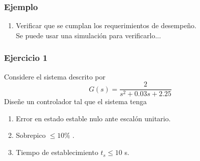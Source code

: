 \documentclass[aspectratio=169]{beamer}
\theoremstyle{definition}
\theoremstyle{plain}
\theoremstyle{remark}
\newcounter{saveenumi}
\newcommand{\conti}{\setcounter{enumi}{\value{saveenumi}}}
\begin{document}
\begin{frame}[<+->]\frametitle{Ejemplo}
	\begin{enumerate}
		\conti
		\item Verificar que se cumplan los requerimientos de desempeño.\\
		\vspace*{5mm}
		Se puede usar una simulación para verificarlo...
	\end{enumerate}
\end{frame}

\begin{frame}[c]\frametitle{Ejercicio 1}
Considere el sistema descrito por
\begin{equation*}
	G(s) = \frac{2}{s^2 + 0.03s + 2.25}
\end{equation*}
Diseñe un controlador tal que el sistema tenga
\begin{enumerate}
	\item Error en estado estable nulo ante escalón unitario.
	\item Sobrepico $\leq 10\%$ .
	\item Tiempo de establecimiento $t_s \leq 10$ s.
\end{enumerate}
\end{frame}
\end{document}
